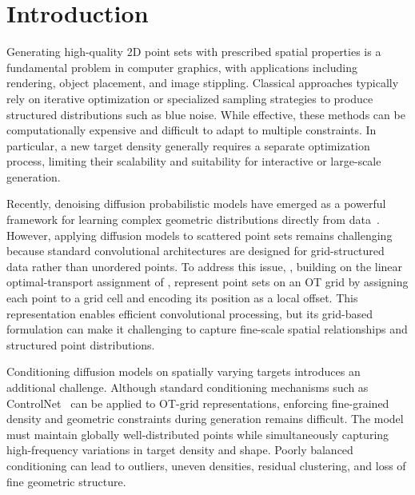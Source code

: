 \documentclass{egpubl}
\providecommand{\citet}[1]{\cite{#1}}
\begin{document}

\section{Introduction}

Generating high-quality 2D point sets with prescribed spatial properties is a fundamental problem in computer graphics, with applications including rendering, object placement, and image stippling. Classical approaches typically rely on iterative optimization or specialized sampling strategies to produce structured distributions such as blue noise. While effective, these methods can be computationally expensive and difficult to adapt to multiple constraints. In particular, a new target density generally requires a separate optimization process, limiting their scalability and suitability for interactive or large-scale generation.

Recently, denoising diffusion probabilistic models have emerged as a powerful framework for learning complex geometric distributions directly from data~\cite{10.1145/3610548.3618243}. However, applying diffusion models to scattered point sets remains challenging because standard convolutional architectures are designed for grid-structured data rather than unordered points. To address this issue, \citet{10.1145/3610548.3618243}, building on the linear optimal-transport assignment of \citet{10.1145/2070781.2024192}, represent point sets on an OT grid by assigning each point to a grid cell and encoding its position as a local offset. This representation enables efficient convolutional processing, but its grid-based formulation can make it challenging to capture fine-scale spatial relationships and structured point distributions.


Conditioning diffusion models on spatially varying targets introduces an additional challenge. Although standard conditioning mechanisms such as ControlNet~\cite{zhang2023adding} can be applied to OT-grid representations, enforcing fine-grained density and geometric constraints during generation remains difficult. The model must maintain globally well-distributed points while simultaneously capturing high-frequency variations in target density and shape. Poorly balanced conditioning can lead to outliers, uneven densities, residual clustering, and loss of fine geometric structure.
\end{document}
